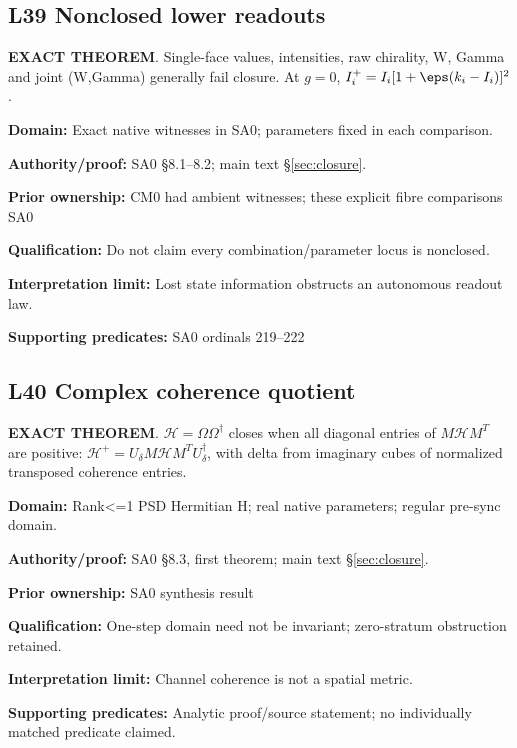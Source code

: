 \par\noindent\begin{minipage}{\linewidth}
\subsection*{L39 Nonclosed lower readouts}
\textbf{EXACT THEOREM}. Single-face values, intensities, raw chirality, W, Gamma and joint (W,Gamma) generally fail closure. At \(g=0\), \(I_i^+=I_i[1+\eps(k_i-I_i)]^2\).\par
\textbf{Domain:} Exact native witnesses in SA0; parameters fixed in each comparison.\par
\textbf{Authority/proof:} SA0 \S{}8.1--8.2; main text \S\ref{sec:closure}.\par
\textbf{Prior ownership:} CM0 had ambient witnesses; these explicit fibre comparisons SA0\par
\textbf{Qualification:} Do not claim every combination/parameter locus is nonclosed.\par
\textbf{Interpretation limit:} Lost state information obstructs an autonomous readout law.\par
\textbf{Supporting predicates:} SA0 ordinals 219--222\par
\end{minipage}\par\medskip
\par\noindent\begin{minipage}{\linewidth}
\subsection*{L40 Complex coherence quotient}
\textbf{EXACT THEOREM}. \(\mathcal H=\Omega\Omega^\dagger\) closes when all diagonal entries of \(M\mathcal HM^T\) are positive: \(\mathcal H^+=U_\delta M\mathcal HM^TU_\delta^\dagger\), with delta from imaginary cubes of normalized transposed coherence entries.\par
\textbf{Domain:} Rank<=1 PSD Hermitian H; real native parameters; regular pre-sync domain.\par
\textbf{Authority/proof:} SA0 \S{}8.3, first theorem; main text \S\ref{sec:closure}.\par
\textbf{Prior ownership:} SA0 synthesis result\par
\textbf{Qualification:} One-step domain need not be invariant; zero-stratum obstruction retained.\par
\textbf{Interpretation limit:} Channel coherence is not a spatial metric.\par
\textbf{Supporting predicates:} Analytic proof/source statement; no individually matched predicate claimed.\par
\end{minipage}\par\medskip

